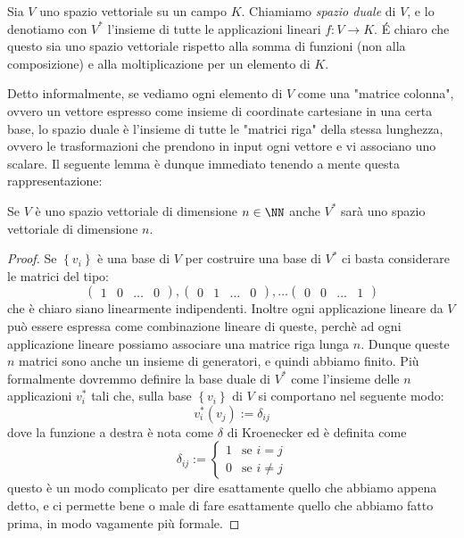\documentclass[11pt]{scrartcl}
\begin{document}
  	 \begin{definition}
  	 	Sia $V$ uno spazio vettoriale su un campo $K$. Chiamiamo \textit{spazio duale} di $V$, e lo denotiamo con $V^*$ l'insieme di tutte le applicazioni lineari $f:V\to K$. \'E chiaro che questo sia uno spazio vettoriale rispetto alla somma di funzioni (non alla composizione) e alla moltiplicazione per un elemento di $K$.
  	 \end{definition}
  	 Detto informalmente, se vediamo ogni elemento di $V$ come una "matrice colonna", ovvero un vettore espresso come insieme di coordinate cartesiane in una certa base, lo spazio duale è l'insieme di tutte le "matrici riga" della stessa lunghezza, ovvero le trasformazioni che prendono in input ogni vettore e vi associano uno scalare. Il seguente lemma è dunque immediato tenendo a mente questa rappresentazione:
  	 \begin{lemma}
  	 	Se $V$ è uno spazio vettoriale di dimensione $n\in\NN$ anche $V^*$ sarà uno spazio vettoriale di dimensione $n$.
  	 \end{lemma}
  	 \begin{proof}
  	 	Se $\left\{v_i\right\}$ è una base di $V$ per costruire una base di $V^*$ ci basta considerare le matrici del tipo:
  	 	$$
  	 	\begin{pmatrix}
  	 		1 & 0 & \dots & 0
  	 	\end{pmatrix},
  	 	\begin{pmatrix}
  	 		0 & 1 & \dots & 0
  	 	\end{pmatrix}, \dots
  	 	\begin{pmatrix}
  	 		0 & 0 & \dots & 1
  	 	\end{pmatrix}
  	 	$$
  	 	che è chiaro siano linearmente indipendenti. Inoltre ogni applicazione lineare da $V$ può essere espressa come combinazione lineare di queste, perchè ad ogni applicazione lineare possiamo associare una matrice riga lunga $n$. Dunque queste $n$ matrici sono anche un insieme di generatori, e quindi abbiamo finito. Più formalmente dovremmo definire la base duale di $V^*$ come l'insieme delle $n$ applicazioni $v_i^*$ tali che, sulla base $\left\{v_i\right\}$ di $V$ si comportano nel seguente modo:
  	 	$$ v_i^*(v_j):=\delta_{ij}$$
  	 	dove la funzione a destra è nota come $\delta$ di Kroenecker ed è definita come
  	 	$$\delta_{ij}:=\begin{cases}
  	 		1 & \text{se } i=j \\
  	 		0 & \text{se } i\ne j
  	 	\end{cases}$$
  	 	questo è un modo complicato per dire esattamente quello che abbiamo appena detto, e ci permette bene o male di fare esattamente quello che abbiamo fatto prima, in modo vagamente più formale.
  	 \end{proof}
\end{document}
